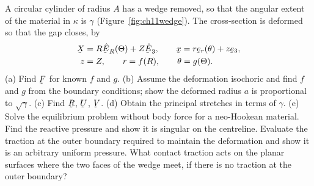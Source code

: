 \begin{problem}
A circular cylinder of radius $A$ has a wedge removed, so that the
angular extent of the material in $\kappa$ is $\gamma$
(Figure~\ref{fig:ch11wedge}). The cross-section is deformed so that the
gap closes, by
\[
\begin{aligned}
   \bX&=R\hbE_{R}(\Theta)+Z\hbE_{3},\qquad
   \bx=r\ber(\theta)+z\be_{3},\\
   z&=Z,\qquad r=f(R),\qquad \theta=g(\Theta).
\end{aligned}
\]
\textup{(a)} Find $\bF$ for known $f$ and $g$.
\textup{(b)} Assume the deformation isochoric and find $f$ and $g$ from
the boundary conditions; show the deformed radius $a$ is proportional to
$\sqrt\gamma$.
\textup{(c)} Find $\bR$, $\bU$, $\bV$.
\textup{(d)} Obtain the principal stretches in terms of $\gamma$.
\textup{(e)} Solve the equilibrium problem without body force for a
neo-Hookean material. Find the reactive pressure and show it is singular
on the centreline. Evaluate the traction at the outer boundary required
to maintain the deformation and show it is an arbitrary uniform
pressure. What contact traction acts on the planar surfaces where the
two faces of the wedge meet, if there is no traction at the outer
boundary?
\end{problem}

